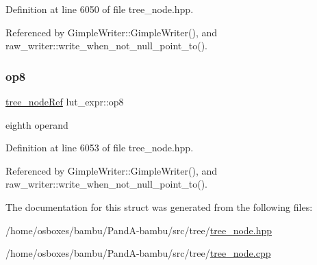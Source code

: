 Definition at line 6050 of file tree\+\_\+node.\+hpp.



Referenced by Gimple\+Writer\+::\+Gimple\+Writer(), and raw\+\_\+writer\+::write\+\_\+when\+\_\+not\+\_\+null\+\_\+point\+\_\+to().

\mbox{\label{structlut__expr_a401cc5d7665c69b84ac3d60c91387a1a}} 
\subsubsection{\texorpdfstring{op8}{op8}}
{\footnotesize\ttfamily \hyperlink{tree__node_8hpp_a6ee377554d1c4871ad66a337eaa67fd5}{tree\+\_\+node\+Ref} lut\+\_\+expr\+::op8}



eighth operand 



Definition at line 6053 of file tree\+\_\+node.\+hpp.



Referenced by Gimple\+Writer\+::\+Gimple\+Writer(), and raw\+\_\+writer\+::write\+\_\+when\+\_\+not\+\_\+null\+\_\+point\+\_\+to().



The documentation for this struct was generated from the following files\+:\begin{DoxyCompactItemize}
\item 
/home/osboxes/bambu/\+Pand\+A-\/bambu/src/tree/\hyperlink{tree__node_8hpp}{tree\+\_\+node.\+hpp}\item 
/home/osboxes/bambu/\+Pand\+A-\/bambu/src/tree/\hyperlink{tree__node_8cpp}{tree\+\_\+node.\+cpp}\end{DoxyCompactItemize}
